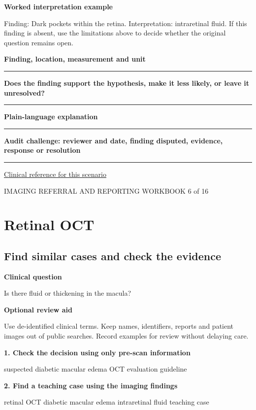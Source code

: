 \documentclass[11pt,a4paper]{article}
\newcommand{\record}[1]{\textbf{#1}\par\vspace{0.55\baselineskip}\hrule\vspace{0.35\baselineskip}}
\begin{document}
\textbf{Worked interpretation example}\par Finding: Dark pockets within the retina. Interpretation: intraretinal fluid. If this finding is absent, use the limitations above to decide whether the original question remains open.\par

\record{Finding, location, measurement and unit}

\record{Does the finding support the hypothesis, make it less likely, or leave it unresolved?}

\record{Plain-language explanation}

\record{Audit challenge: reviewer and date, finding disputed, evidence, response or resolution}

\small\href{https://www.aaojournal.org/article/S0161-6420(19)32902-5/fulltext/}{Clinical reference for this scenario}

\normalsize

\newpage

{\small IMAGING REFERRAL AND REPORTING WORKBOOK \hfill 6 of 16}

\section*{Retinal OCT}

\subsection*{Find similar cases and check the evidence}

\textbf{Clinical question}\par Is there fluid or thickening in the macula?\par

\textbf{Optional review aid}\par Use de-identified clinical terms. Keep names, identifiers, reports and patient images out of public searches. Record examples for review without delaying care.\par

\textbf{1. Check the decision using only pre-scan information}\par suspected diabetic macular edema OCT evaluation guideline\par

\textbf{2. Find a teaching case using the imaging findings}\par retinal OCT diabetic macular edema intraretinal fluid teaching case\par
\end{document}

